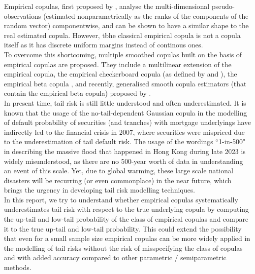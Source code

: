 \documentclass[12pt]{report}
\newcommand{\1}{\mathbf{1}}
\begin{document}
\begin{flushleft}
\vspace{0.5cm}
Empirical copulas, first proposed by \cite{DeheuvelsEC}, analyse the multi-dimensional pseudo-observations (estimated nonparametrically as the ranks of the components of the random vector) componentwise, and can be shown to have a similar shape to the real estimated copula. However, tbhe classical empirical copula is not a copula itself as it has discrete uniform margins instead of continous ones. \\
\vspace{0.5cm}
To overcome this shortcoming, multiple smoothed copulas built on the basis of empirical copulas are proposed. They include a multilinear extension of the empirical copula, the empirical checkerboard copula (as defined by \cite{CarleyTaylorECC} and \cite{HofertBook}), the empirical beta copula \parencite{SegersEBC}, and recently, generalised smooth copula estimators (that contain the empirical beta copula) proposed by \cite{KojadinovicYi2024Smooth}. \\
\vspace{0.5cm}
In present time, tail risk is still little understood and often underestimated. It is known that the usage of the no-tail-dependent Gaussian copula in the modelling of default probability of securities (and tranches) with mortgage underlyings have indirectly led to the financial crisis in 2007, where securities were mispriced due to the underestimation of tail default risk. The usage of the wordings ``1-in-500" in describing the massive flood that happened in Hong Kong during late 2023 is widely misunderstood, as there are no 500-year worth of data in understanding an event of this scale. Yet, due to global warming, these large scale national disasters will be recurring (or even commonplace) in the near future, which brings the urgency in developing tail risk modelling techniques. \\
\vspace{0.5cm}
In this report, we try to understand whether empirical copulas systematically underestimates tail risk with respect to the true underlying copula by computing the up-tail and low-tail probability of the class of empirical copulas and compare it to the true up-tail and low-tail probability. This could extend the possibility that even for a small sample size empirical copulas can be more widely applied in the modelling of tail risks without the risk of misspecifying the class of copulas and with added accuracy compared to other parametric / semiparametric methods. \\
\vspace{0.5cm}



\end{flushleft}
\end{document}
